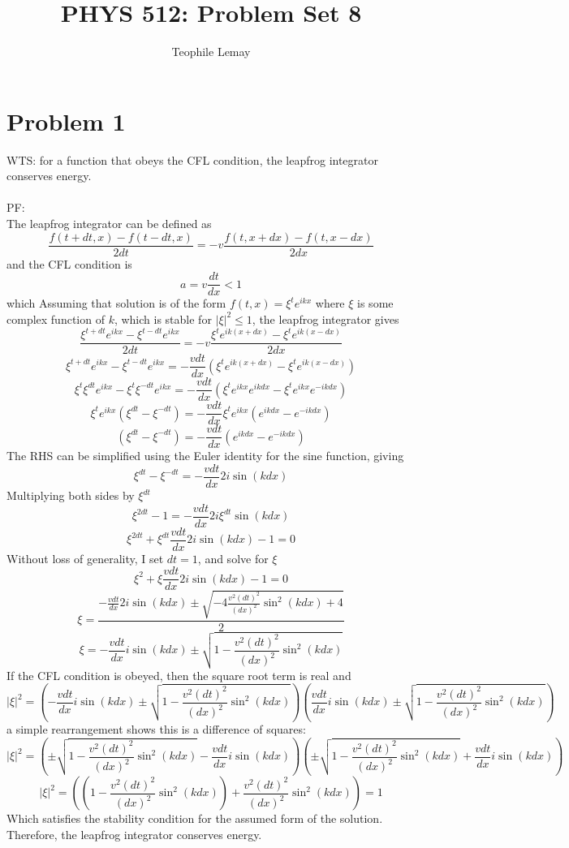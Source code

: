 \documentclass{article}
\title{PHYS 512: Problem Set 8}
\author{Teophile Lemay}
\date{}
\newcommand{\<}[1]{\left\langle #1 \right\rangle }
\begin{document}
\maketitle

\section{Problem 1}
WTS: for a function that obeys the CFL condition, the leapfrog integrator conserves energy.\\
\\
PF:\\
The leapfrog integrator can be defined as 
\[ \frac{f(t+ dt, x) - f(t-dt, x)}{2dt} = -v\frac{f(t, x+dx) - f(t, x-dx)}{2dx} \]
and the CFL condition is 
\[ a = v\frac{dt}{dx} < 1 \] which 
Assuming that solution is of the form $f(t,x) = \xi^t e^{ikx}$ where $\xi$ is some complex function of $k$, which is stable for $|\xi|^2 \leq 1$, the leapfrog integrator gives
\[ \frac{\xi^{t+dt} e^{ikx} - \xi^{t-dt} e^{ikx}}{2dt} = -v\frac{\xi^t e^{ik(x+dx)} - \xi^t e^{ik(x-dx)} }{2dx} \]
\[ \xi^{t+dt} e^{ikx} - \xi^{t-dt} e^{ikx} = -\frac{vdt}{dx}\left(\xi^t e^{ik(x+dx)} - \xi^t e^{ik(x-dx)}\right)  \]
\[ \xi^{t}\xi^{dt}e^{ikx} - \xi^{t}\xi^{-dt}e^{ikx} = -\frac{vdt}{dx}\left(\xi^t e^{ikx}e^{ikdx} - \xi^t e^{ikx}e^{-ikdx}\right)  \]
\[ \xi^{t}e^{ikx}\left(\xi^{dt} - \xi^{-dt}\right) = -\frac{vdt}{dx}\xi^t e^{ikx}\left(e^{ikdx} - e^{-ikdx}\right)  \]
\[ \left(\xi^{dt} - \xi^{-dt}\right) = -\frac{vdt}{dx}\left(e^{ikdx} - e^{-ikdx}\right)  \]
The RHS can be simplified using the Euler identity for the sine function, giving 
\[ \xi^{dt} - \xi^{-dt} = -\frac{vdt}{dx}2i\sin(kdx) \]
Multiplying both sides by $\xi^{dt}$
\[ \xi^{2dt} - 1 = -\frac{vdt}{dx}2i\xi^{dt}\sin(kdx) \]
\[ \xi^{2dt} + \xi^{dt}\frac{vdt}{dx}2i\sin(kdx) -1 = 0 \]
Without loss of generality, I set $dt = 1$, and solve for $\xi$
\[ \xi^{2} + \xi\frac{vdt}{dx}2i\sin(kdx) -1 = 0 \]
\[\xi = \frac{-\frac{vdt}{dx}2i\sin(kdx) \pm \sqrt{-4\frac{v^2(dt)^2}{(dx)^2}\sin^2(kdx) + 4}}{2}\]
\[\xi = -\frac{vdt}{dx}i\sin(kdx) \pm \sqrt{1 -\frac{v^2(dt)^2}{(dx)^2}\sin^2(kdx)}\]
If the CFL condition is obeyed, then the square root term is real and
\[|\xi|^2 = \left(-\frac{vdt}{dx}i\sin(kdx) \pm \sqrt{1 -\frac{v^2(dt)^2}{(dx)^2}\sin^2(kdx)}\right)\left(\frac{vdt}{dx}i\sin(kdx) \pm \sqrt{1 -\frac{v^2(dt)^2}{(dx)^2}\sin^2(kdx)}\right) \]
a simple rearrangement shows this is a difference of squares:
\[|\xi|^2 = \left( \pm \sqrt{1 -\frac{v^2(dt)^2}{(dx)^2}\sin^2(kdx)} - \frac{vdt}{dx}i\sin(kdx) \right)\left(\pm \sqrt{1 -\frac{v^2(dt)^2}{(dx)^2}\sin^2(kdx)} + \frac{vdt}{dx}i\sin(kdx) \right) \]
\[|\xi|^2 = \left( \left(1 -\frac{v^2(dt)^2}{(dx)^2}\sin^2(kdx)\right) + \frac{v^2(dt)^2}{(dx)^2}\sin^2(kdx) \right) = 1\]
Which satisfies the stability condition for the assumed form of the solution. Therefore, the leapfrog integrator conserves energy.
\end{document}
